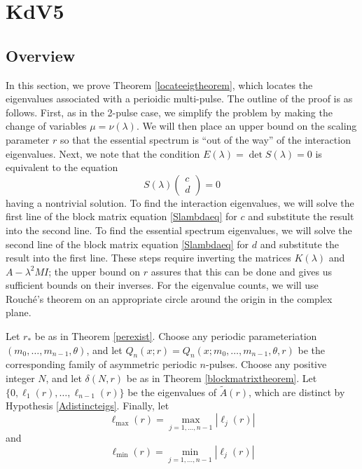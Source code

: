 \documentclass[thesis.tex]{subfiles}
\begin{document}
\iffulldocument\else
	\chapter{KdV5}
\fi

\section{Overview}

In this section, we prove Theorem \ref{locateeigtheorem}, which locates the eigenvalues associated with a perioidic multi-pulse. The outline of the proof is as follows. First, as in the 2-pulse case, we simplify the problem by making the change of variables $\mu = \nu(\lambda)$. We will then place an upper bound on the scaling parameter $r$ so that the essential spectrum is ``out of the way'' of the interaction eigenvalues. Next, we note that the condition $E(\lambda) = \det S(\lambda) = 0$ is equivalent to the equation
\begin{equation}\label{Slambdaeq}
S(\lambda)\begin{pmatrix}c\\d\end{pmatrix} = 0
\end{equation}
having a nontrivial solution. To find the interaction eigenvalues, we will solve the first line of the block matrix equation \cref{Slambdaeq} for $c$ and substitute the result into the second line. To find the essential spectrum eigenvalues, we will solve the second line of the block matrix equation \cref{Slambdaeq} for $d$ and substitute the result into the first line. These steps require inverting the matrices $K(\lambda)$ and $A - \lambda^2 M I$; the upper bound on $r$ assures that this can be done and gives us sufficient bounds on their inverses. For the eigenvalue counts, we will use Rouch\'e's theorem on an appropriate circle around the origin in the complex plane.

Let $r_*$ be as in Theorem \ref{perexist}. Choose any periodic parameteriation $(m_0, \dots, m_{n-1}, \theta)$, and let $Q_n(x; r) = Q_n(x; m_0, \dots, m_{n-1}, \theta, r)$ be the corresponding family of asymmetric periodic $n$-pulses. Choose any positive integer $N$, and let $\delta(N,r)$ be as in Theorem \ref{blockmatrixtheorem}. Let $\{ 0, \ell_1(r), \dots, \ell_{n-1}(r) \}$ be the eigenvalues of $\tilde{A}(r)$, which are distinct by Hypothesis \ref{Adistincteigs}. Finally, let
\[
\ell_{\max}(r) = \max_{j = 1, \dots, n-1}|\ell_j(r)|
\]
and
\[
\ell_{\min}(r) = \min_{j = 1, \dots, n-1}|\ell_j(r)|
\]
\end{document}
